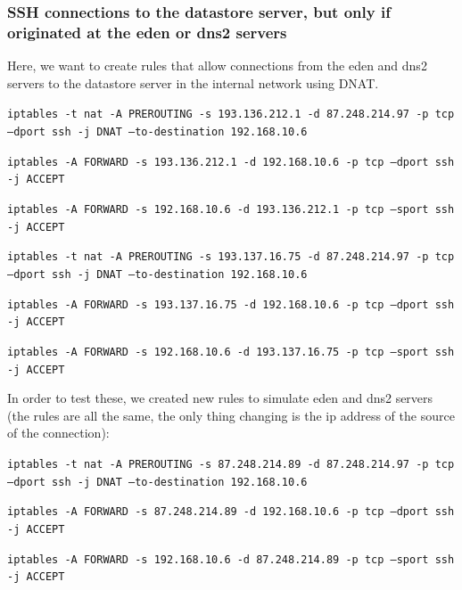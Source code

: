 \documentclass{article}
\begin{document}
\subsubsection{SSH connections to the datastore server, but only if originated at the eden or dns2 servers}
\quad Here, we want to create rules that allow connections from the eden and dns2 servers to the datastore server in the internal network using DNAT.

\texttt{}\par
\texttt{iptables -t nat -A PREROUTING -s 193.136.212.1 -d 87.248.214.97 -p tcp --dport ssh -j DNAT --to-destination 192.168.10.6}\par
\texttt{iptables -A FORWARD -s 193.136.212.1 -d 192.168.10.6 -p tcp --dport ssh -j ACCEPT}\par
\texttt{iptables -A FORWARD -s 192.168.10.6 -d 193.136.212.1 -p tcp --sport ssh -j ACCEPT}\par
\texttt{iptables -t nat -A PREROUTING -s 193.137.16.75 -d 87.248.214.97 -p tcp --dport ssh -j DNAT --to-destination 192.168.10.6}\par
\texttt{iptables -A FORWARD -s 193.137.16.75 -d 192.168.10.6 -p tcp --dport ssh -j ACCEPT}\par
\texttt{iptables -A FORWARD -s 192.168.10.6 -d 193.137.16.75 -p tcp --sport ssh -j ACCEPT}\par
\texttt{}\par

In order to test these, we created new rules to simulate eden and dns2 servers (the rules are all the same, the only thing changing is the ip address of the source of the connection):

\texttt{iptables -t nat -A PREROUTING -s 87.248.214.89 -d 87.248.214.97 -p tcp --dport ssh -j DNAT --to-destination 192.168.10.6}\par
\texttt{iptables -A FORWARD -s 87.248.214.89 -d 192.168.10.6 -p tcp --dport ssh -j ACCEPT}\par
\texttt{iptables -A FORWARD -s 192.168.10.6 -d 87.248.214.89 -p tcp --sport ssh -j ACCEPT}\par
\texttt{}\par
\end{document}
